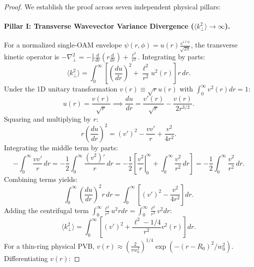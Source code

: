 \documentclass{optica-article}
\begin{document}
\begin{proof}
We establish the proof across seven independent physical pillars:

\paragraph{Pillar I: Transverse Wavevector Variance Divergence ($\langle k_\perp^2 \rangle \to \infty$).}
For a normalized single-OAM envelope $\psi(r, \phi) = u(r) \frac{e^{i \ell \phi}}{\sqrt{2\pi}}$, the transverse kinetic operator is $-\nabla_\perp^2 = -\frac{1}{r}\frac{d}{dr}(r\frac{d}{dr}) + \frac{\ell^2}{r^2}$. Integrating by parts:
\begin{equation}
\langle k_\perp^2 \rangle = \int_0^\infty \left[ \left( \frac{du}{dr} \right)^2 + \frac{\ell^2}{r^2} u^2(r) \right] r \, dr.
\label{eq:kperp_integral}
\end{equation}
Under the 1D unitary transformation $v(r) \equiv \sqrt{r} u(r)$ with $\int_0^\infty v^2(r) dr = 1$:
\begin{equation}
u(r) = \frac{v(r)}{\sqrt{r}} \implies \frac{du}{dr} = \frac{v'(r)}{\sqrt{r}} - \frac{v(r)}{2 r^{3/2}}.
\label{eq:unitary_trans}
\end{equation}
Squaring and multiplying by $r$:
\begin{equation}
r \left( \frac{du}{dr} \right)^2 = (v')^2 - \frac{v v'}{r} + \frac{v^2}{4 r^2}.
\label{eq:squared_derivative}
\end{equation}
Integrating the middle term by parts:
\begin{equation}
- \int_0^\infty \frac{v v'}{r} \, dr = - \frac{1}{2} \int_0^\infty \frac{(v^2)'}{r} \, dr = - \frac{1}{2} \left[ \left. \frac{v^2}{r} \right|_0^\infty + \int_0^\infty \frac{v^2}{r^2} \, dr \right] = - \frac{1}{2} \int_0^\infty \frac{v^2}{r^2} \, dr.
\label{eq:parts_integration}
\end{equation}
Combining terms yields:
\begin{equation}
\int_0^\infty \left( \frac{du}{dr} \right)^2 r \, dr = \int_0^\infty \left[ (v')^2 - \frac{v^2}{4 r^2} \right] dr.
\label{eq:radial_kinetic_trans}
\end{equation}
Adding the centrifugal term $\int_0^\infty \frac{\ell^2}{r^2} u^2 r dr = \int_0^\infty \frac{\ell^2}{r^2} v^2 dr$:
\begin{equation}
\langle k_\perp^2 \rangle = \int_0^\infty \left[ (v')^2 + \frac{\ell^2 - 1/4}{r^2} v^2(r) \right] dr.
\label{eq:kperp_exact_v}
\end{equation}
For a thin-ring physical PVB, $v(r) \approx (\frac{2}{\pi w_0^2})^{1/4} \exp(-(r - R_0)^2 / w_0^2)$. Differentiating $v(r)$:

\end{proof}
\end{document}
